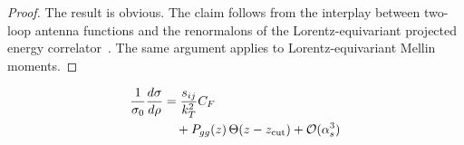 \begin{proof}
The result is obvious. The claim follows from the interplay between
two-loop antenna functions and the renormalons of the
Lorentz-equivariant projected energy
correlator~\cite{TPC:0270-Harnessing-Interpretable-by-Design-Effective-Theories-for-Jet-Substructure-September-21-2026}.
The same argument applies to Lorentz-equivariant Mellin moments.
\end{proof}

\begin{align}
  \frac{1}{\sigma_0} \frac{d\sigma}{d\rho} &= \frac{s_{ij}}{k_T^2} C_F \nonumber \\
  &\quad + P_{gg}(z) \, \Theta(z - z_{\rm cut}) + \mathcal{O}(\alpha_s^3) \label{eq:7}
\end{align}

